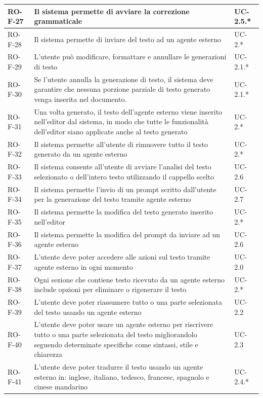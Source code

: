 \documentclass[11pt,a4paper]{article}
\begin{document}
\begin{longtable}{|p{}|>{\raggedright\arraybackslash}p{}|p{}|}
\hline
RO-F-27 & Il sistema permette di avviare la correzione grammaticale & UC-2.5.* \\
\hline
RO-F-28 & Il sistema permette di inviare del testo ad un agente esterno & UC-2.* \\
\hline
RO-F-29 & L’utente può modificare, formattare e annullare le generazioni di testo & UC-2.1.* \\
\hline
RO-F-30 & Se l'utente annulla la generazione di testo, il sistema deve garantire che nessuna porzione parziale di testo generato venga inserita nel documento.
 & UC-2.1.* \\
\hline
RO-F-31 & Una volta generato, il testo dell'agente esterno viene inserito nell'editor dal sistema, in modo che tutte le funzionalità dell'editor siano applicate anche al testo generato & UC-2.* \\
\hline
RO-F-32 & Il sistema permette all'utente di rimuovere tutto il testo generato da un agente esterno& UC-2.* \\
\hline
RO-F-33 & Il sistema consente all'utente di avviare l'analisi del testo selezionato o dell'intero testo utilizzando il cappello scelto & UC-2.6 \\
\hline
RO-F-34 & Il sistema permette l'invio di un prompt scritto dall’utente per la generazione del testo tramite agente esterno & UC-2.7 \\
\hline
RO-F-35 & Il sistema permette la modifica del testo generato inserito nell'editor & UC-2.* \\
\hline
RO-F-36 & Il sistema permette la modifica del prompt da inviare ad un agente esterno & UC-2.6 \\
\hline
RO-F-37 & L'utente deve poter accedere alle azioni sul testo tramite agente esterno in ogni momento & UC-2.0 \\
\hline
RO-F-38 & Ogni sezione che contiene testo ricevuto da un agente esterno include opzioni per eliminare o rigenerare il testo & UC-2.* \\
\hline
RO-F-39 & L'utente deve poter riassumere tutto o una parte selezionata del testo usando un agente esterno & UC-2.2 \\
\hline
RO-F-40 &  L'utente deve poter usare un agente esterno per riscrivere tutto o una parte selezionata del testo migliorandolo seguendo determinate specifiche come sintassi, stile e chiarezza & UC-2.3 \\
\hline
RO-F-41 & L'utente deve poter tradurre il testo usando un agente esterno in: inglese, italiano, tedesco, francese, spagnolo e cinese mandarino & UC-2.4.* \\

\end{longtable}
\end{document}
